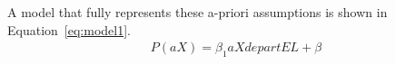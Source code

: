 A model that fully represents these a-priori assumptions is shown in Equation~\ref{eq:model1}.
\begin{align}
    P(aX) = \beta_1 aXdepartEL + \beta
\end{align}
